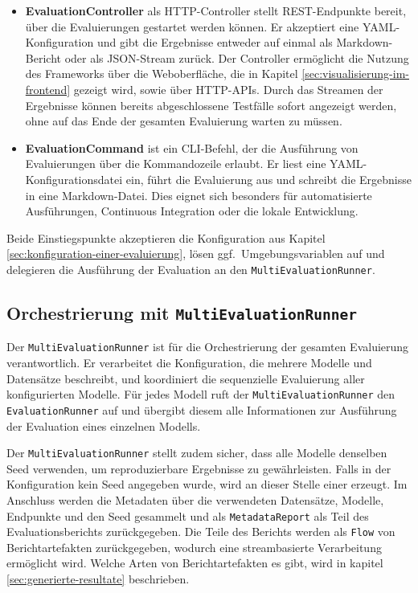 \begin{itemize}
    \item \textbf{EvaluationController} als HTTP-Controller stellt REST-Endpunkte bereit, über die Evaluierungen gestartet werden können. Er akzeptiert eine YAML-Konfiguration und gibt die Ergebnisse entweder auf einmal als Markdown-Bericht oder als JSON-Stream zurück. Der Controller ermöglicht die Nutzung des Frameworks über die Weboberfläche, die in Kapitel \ref{sec:visualisierung-im-frontend} gezeigt wird, sowie über HTTP-APIs. Durch das Streamen der Ergebnisse können bereits abgeschlossene Testfälle sofort angezeigt werden, ohne auf das Ende der gesamten Evaluierung warten zu müssen.
    \item \textbf{EvaluationCommand} ist ein CLI-Befehl, der die Ausführung von Evaluierungen über die Kommandozeile erlaubt. Er liest eine YAML-Konfigurationsdatei ein, führt die Evaluierung aus und schreibt die Ergebnisse in eine Markdown-Datei. Dies eignet sich besonders für automatisierte Ausführungen, Continuous Integration oder die lokale Entwicklung.
\end{itemize}

Beide Einstiegspunkte akzeptieren die Konfiguration aus Kapitel \ref{sec:konfiguration-einer-evaluierung}, lösen ggf.\ Umgebungsvariablen auf und delegieren die Ausführung der Evaluation an den \texttt{MultiEvaluationRunner}.

\subsection*{Orchestrierung mit \texttt{MultiEvaluationRunner}}

Der \texttt{MultiEvaluationRunner} ist für die Orchestrierung der gesamten Evaluierung verantwortlich. Er verarbeitet die Konfiguration, die mehrere Modelle und Datensätze beschreibt, und koordiniert die sequenzielle Evaluierung aller konfigurierten Modelle. Für jedes Modell ruft der \texttt{MultiEvaluationRunner} den \texttt{EvaluationRunner} auf und übergibt diesem alle Informationen zur Ausführung der Evaluation eines einzelnen Modells.

Der \texttt{MultiEvaluationRunner} stellt zudem sicher, dass alle Modelle denselben Seed verwenden, um reproduzierbare Ergebnisse zu gewährleisten. Falls in der Konfiguration kein Seed angegeben wurde, wird an dieser Stelle einer erzeugt. Im Anschluss werden die Metadaten über die verwendeten Datensätze, Modelle, Endpunkte und den Seed gesammelt und als \texttt{MetadataReport} als Teil des Evaluationsberichts zurückgegeben. Die Teile des Berichts werden als \texttt{Flow} von Berichtartefakten zurückgegeben, wodurch eine streambasierte Verarbeitung ermöglicht wird. Welche Arten von Berichtartefakten es gibt, wird in kapitel \ref{sec:generierte-resultate} beschrieben.


